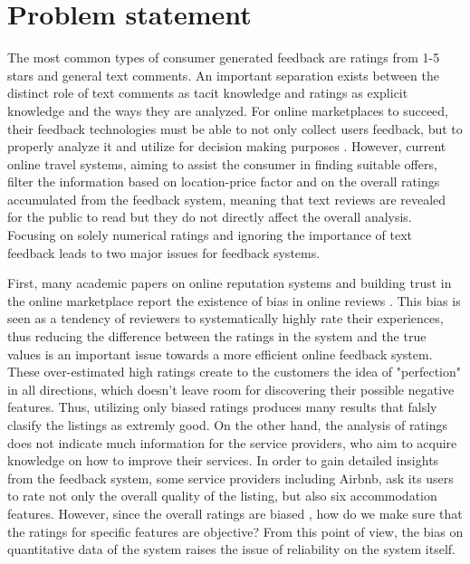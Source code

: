 \section{Problem statement}
%
The most common types of consumer generated feedback are ratings from 1-5 stars and general text comments. An important separation exists between the distinct role of text comments as tacit knowledge and ratings as explicit knowledge and the ways they are analyzed. For online marketplaces to succeed, their feedback technologies must be able to not only collect users feedback, but to properly analyze it and utilize for decision making purposes \cite{pavlou2006nature}. However, current online travel systems, aiming to assist the consumer in finding suitable offers, filter the information based on location-price factor and on the overall ratings accumulated from the feedback system, meaning that text reviews are revealed for the public to read but they do not directly affect the overall analysis. Focusing on solely numerical ratings and ignoring the importance of text feedback leads to two major issues for feedback systems. 
%
%

First, many academic papers on online reputation systems and building trust in the online marketplace report the existence of bias in online reviews \cite{bolton2013engineering,dellarocas2008sound,dini2009buying,fradkin2016bias,ghose2011estimating,resnick2006value}. This bias is seen as a tendency of reviewers to systematically highly rate their experiences, thus reducing the difference between the ratings in the system and the true values is an important issue towards a more efficient online feedback system. These over-estimated high ratings create to the customers the idea of "perfection" in all directions, which doesn't leave room for discovering their possible negative features. Thus, utilizing only biased ratings produces many results that falsly clasify the listings as extremly good. On the other hand, the analysis of ratings does not indicate much information for the service providers, who aim to acquire knowledge on how to improve their services. In order to gain detailed insights from the feedback system, some service providers including Airbnb, ask its users to rate not only the overall quality of the listing, but also six accommodation features. However, since the overall ratings are biased \cite{fradkin2016bias}, how do we make sure that the ratings for specific features are objective? From this point of view, the bias on quantitative data of the system raises the issue of reliability on the system itself.

